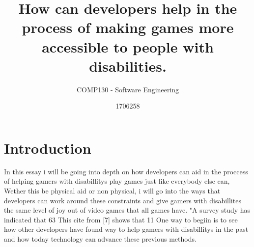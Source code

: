 \documentclass{scrartcl}
\title{How can developers help in the process of making games more accessible to people with disabilities.}
\subtitle{COMP130 - Software Engineering}
\author{1706258}
\begin{document}
\maketitle


\section{Introduction}
In this essay i will be going into depth on how developers can aid in the proccess of helping gamers with disabillitys play games just like everybody else can, Wether this be physical aid or non physical, i will go into the ways that developers can work around these constraints and give gamers with disabillites the same level of joy out of video games that all games have.
"A survey study has indicated that 63%
This cite from [7] shows that 11%
One way to begiin is to see how other developers have found way to help gamers with disabillitys in the past and how today technology can advance these previous methods.
\end{document}
